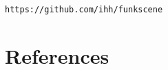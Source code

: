 \documentclass{acm_proc_article-sp}
\begin{document}
{\tt https://github.com/ihh/funkscene}

\section{References}




\balancecolumns
\end{document}
